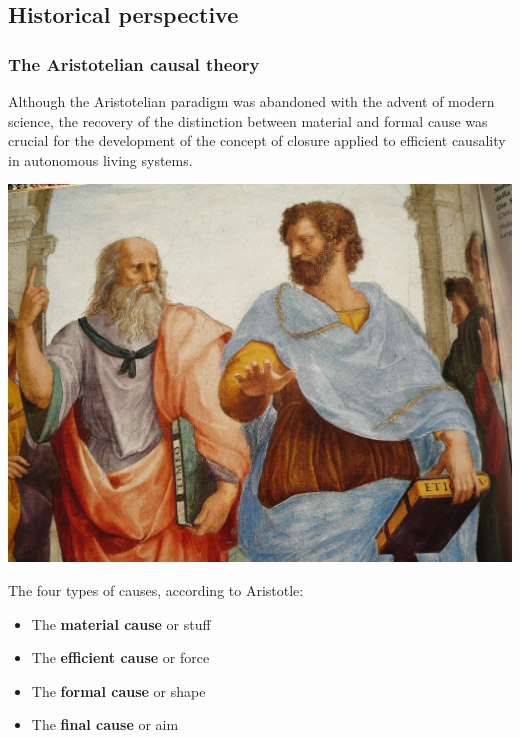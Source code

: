 
\subsection{Historical perspective}

\begin{frame}

\frametitle{The Aristotelian causal theory}

Although the Aristotelian paradigm was abandoned with the advent of modern science, the recovery of the distinction between material and formal cause was crucial for the development of the concept of closure applied to efficient causality in autonomous living systems.

	
\begin{center}
\includegraphics[width=3 cm]{fig/aristotle.jpg}

\end{center}
The four types of causes, according to Aristotle:	
 \begin{itemize}
  \item The \textbf{material cause} or stuff
  \item The \textbf{efficient cause} or force
  \item The \textbf{formal cause} or shape
  \item The \textbf{final cause} or aim
  \end{itemize}
\end{frame}



